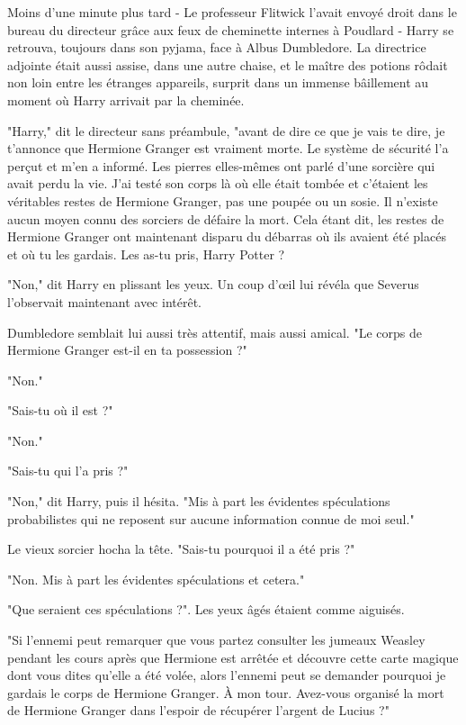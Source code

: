 Moins d'une minute plus tard - Le professeur Flitwick l'avait envoyé droit dans le bureau du directeur grâce aux feux de cheminette internes à Poudlard - Harry se retrouva, toujours dans son pyjama, face à Albus Dumbledore. La directrice adjointe était aussi assise, dans une autre chaise, et le maître des potions rôdait non loin entre les étranges appareils, surprit dans un immense bâillement au moment où Harry arrivait par la cheminée.

"Harry," dit le directeur sans préambule, "avant de dire ce que je vais te dire, je t'annonce que Hermione Granger est vraiment morte. Le système de sécurité l'a perçut et m'en a informé. Les pierres elles-mêmes ont parlé d'une sorcière qui avait perdu la vie. J'ai testé son corps là où elle était tombée et c'étaient les véritables restes de Hermione Granger, pas une poupée ou un sosie. Il n'existe aucun moyen connu des sorciers de défaire la mort. Cela étant dit, les restes de Hermione Granger ont maintenant disparu du débarras où ils avaient été placés et où tu les gardais. Les as-tu pris, Harry Potter ?

"Non," dit Harry en plissant les yeux. Un coup d'œil lui révéla que Severus l'observait maintenant avec intérêt.

Dumbledore semblait lui aussi très attentif, mais aussi amical. "Le corps de Hermione Granger est-il en ta possession ?"

"Non."

"Sais-tu où il est ?"

"Non."

"Sais-tu qui l'a pris ?"

"Non," dit Harry, puis il hésita. "Mis à part les évidentes spéculations probabilistes qui ne reposent sur aucune information connue de moi seul."

Le vieux sorcier hocha la tête. "Sais-tu pourquoi il a été pris ?"

"Non. Mis à part les évidentes spéculations et cetera."

"Que seraient ces spéculations ?". Les yeux âgés étaient comme aiguisés.

"Si l'ennemi peut remarquer que vous partez consulter les jumeaux Weasley pendant les cours après que Hermione est arrêtée et découvre cette carte magique dont vous dites qu'elle a été volée, alors l'ennemi peut se demander pourquoi je gardais le corps de Hermione Granger. À mon tour. Avez-vous organisé la mort de Hermione Granger dans l'espoir de récupérer l'argent de Lucius ?"

